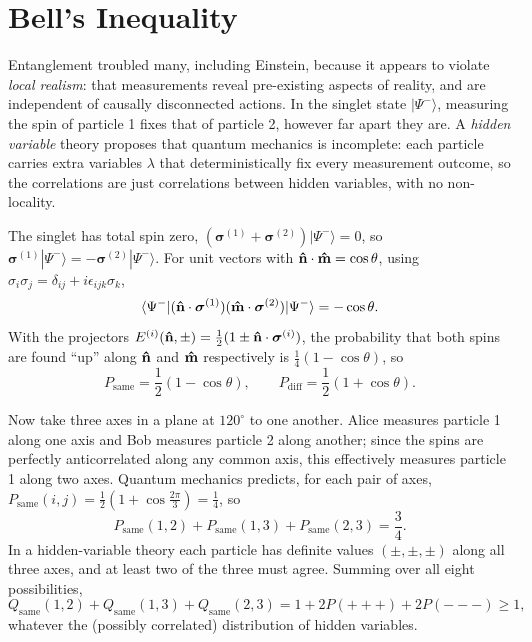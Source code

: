 \section{Bell's Inequality}

Entanglement troubled many, including Einstein, because it appears to violate \emph{local realism}: that measurements reveal pre-existing aspects of reality, and are independent of causally disconnected actions. In the singlet state $|\Psi^-\rangle$, measuring the spin of particle 1 fixes that of particle 2, however far apart they are. A \emph{hidden variable} theory proposes that quantum mechanics is incomplete: each particle carries extra variables $\lambda$ that deterministically fix every measurement outcome, so the correlations are just correlations between hidden variables, with no non-locality.

The singlet has total spin zero, $(\bm{\sigma}^{(1)} + \bm{\sigma}^{(2)})|\Psi^-\rangle = 0$, so $\bm{\sigma}^{(1)}|\Psi^-\rangle = -\bm{\sigma}^{(2)}|\Psi^-\rangle$. For unit vectors with $\boldsymbol{\hat{\textbf{n}}}\cdot\boldsymbol{\hat{\textbf{m}}} = \cos\theta$, using $\sigma_i\sigma_j = \delta_{ij} + i\epsilon_{ijk}\sigma_k$,
\[
    \langle\Psi^-|(\boldsymbol{\hat{\textbf{n}}}\cdot\bm{\sigma}^{(1)})(\boldsymbol{\hat{\textbf{m}}}\cdot\bm{\sigma}^{(2)})|\Psi^-\rangle = -\cos\theta .
\]
With the projectors $E^{(i)}(\boldsymbol{\hat{\textbf{n}}},\pm) = \frac12(1\pm\boldsymbol{\hat{\textbf{n}}}\cdot\bm{\sigma}^{(i)})$, the probability that both spins are found ``up'' along $\boldsymbol{\hat{\textbf{n}}}$ and $\boldsymbol{\hat{\textbf{m}}}$ respectively is $\frac14(1-\cos\theta)$, so
\[
    P_{\text{same}} = \frac12(1-\cos\theta),
    \qquad
    P_{\text{diff}} = \frac12(1+\cos\theta).
\]

Now take three axes in a plane at $120^\circ$ to one another. Alice measures particle 1 along one axis and Bob measures particle 2 along another; since the spins are perfectly anticorrelated along any common axis, this effectively measures particle 1 along two axes. Quantum mechanics predicts, for each pair of axes, $P_{\text{same}}(i,j) = \frac12(1+\cos\frac{2\pi}{3}) = \frac14$, so
\[
    P_{\text{same}}(1,2) + P_{\text{same}}(1,3) + P_{\text{same}}(2,3) = \frac34 .
\]
In a hidden-variable theory each particle has definite values $(\pm,\pm,\pm)$ along all three axes, and at least two of the three must agree. Summing over all eight possibilities,
\[
    Q_{\text{same}}(1,2) + Q_{\text{same}}(1,3) + Q_{\text{same}}(2,3) = 1 + 2P(+++) + 2P(---)\ge1,
\]
whatever the (possibly correlated) distribution of hidden variables.

